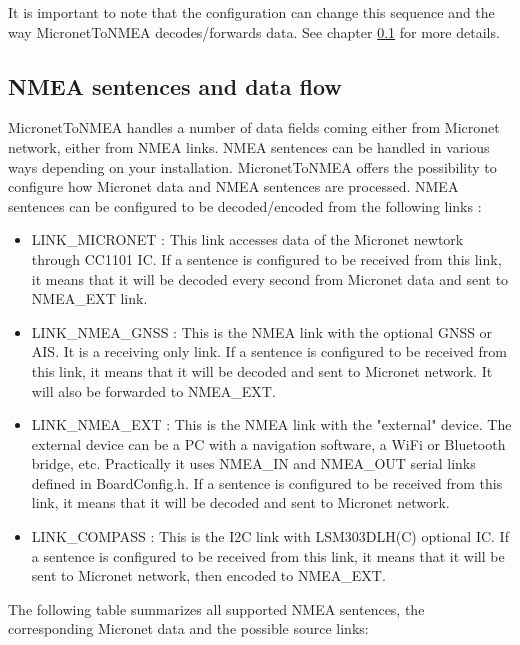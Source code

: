 \documentclass{report}
\begin{document}
It is important to note that the configuration can change this sequence and the way MicronetToNMEA decodes/forwards data. See chapter {\ref{supportednmeasentences}} for more details.

\subsection{NMEA sentences and data flow}\label{supportednmeasentences}

MicronetToNMEA handles a number of data fields coming either from Micronet network, either from NMEA links.
NMEA sentences can be handled in various ways depending on your installation. MicronetToNMEA offers the possibility to configure how Micronet data and NMEA sentences are processed. NMEA sentences can be configured to be decoded/encoded from the following links :
\begin{itemize}
	\item LINK\_MICRONET : This link accesses data of the Micronet newtork through CC1101 IC. If a sentence is configured to be received from this link, it means that it will be decoded every second from Micronet data and sent to NMEA\_EXT link.
	\item LINK\_NMEA\_GNSS : This is the NMEA link with the optional GNSS or AIS. It is a receiving only link. If a sentence is configured to be received from this link, it means that it will be decoded and sent to Micronet network. It will also be forwarded to NMEA\_EXT.
	\item LINK\_NMEA\_EXT : This is the NMEA link with the "external" device. The external device can be a PC with a navigation software, a WiFi or Bluetooth bridge, etc. Practically it uses NMEA\_IN and NMEA\_OUT serial links defined in BoardConfig.h. If a sentence is configured to be received from this link, it means that it will be decoded and sent to Micronet network.
	\item LINK\_COMPASS : This is the I2C link with LSM303DLH(C) optional IC. If a sentence is configured to be received from this link, it means that it will be sent to Micronet network, then encoded to NMEA\_EXT. 
\end{itemize}

The following table summarizes all supported NMEA sentences, the corresponding Micronet data and the possible source links:
\end{document}
